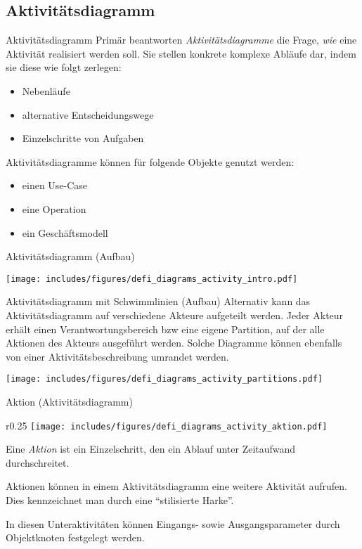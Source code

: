 \subsection{Aktivitätsdiagramm}

\begin{defi}{Aktivitätsdiagramm}
    Primär beantworten \emph{Aktivitätsdiagramme} die Frage, \emph{wie} eine Aktivität realisiert werden soll.
    Sie stellen konkrete komplexe Abläufe dar, indem sie diese wie folgt zerlegen:
    \begin{itemize}
        \item Nebenläufe
        \item alternative Entscheidungswege
        \item Einzelschritte von Aufgaben
    \end{itemize}

    Aktivitätsdiagramme können für folgende Objekte genutzt werden:
    \begin{itemize}
        \item einen Use-Case
        \item eine Operation
        \item ein Geschäftsmodell
    \end{itemize}
\end{defi}

\begin{diag}{Aktivitätsdiagramm (Aufbau)}
    \begin{center}
        \texttt{[image: includes/figures/defi\_diagrams\_activity\_intro.pdf]}
    \end{center}
\end{diag}

\begin{diag}{Aktivitätsdiagramm mit Schwimmlinien (Aufbau)}
    Alternativ kann das Aktivitätsdiagramm auf verschiedene Akteure aufgeteilt werden.
    Jeder Akteur erhält einen Verantwortungsbereich bzw eine eigene Partition, auf der alle Aktionen des Akteurs ausgeführt werden.
    Solche Diagramme können ebenfalls von einer Aktivitätsbeschreibung umrandet werden.
    \begin{center}
        \texttt{[image: includes/figures/defi\_diagrams\_activity\_partitions.pdf]}
    \end{center}
\end{diag}

\begin{diag}{Aktion (Aktivitätsdiagramm)}
    \begin{wrapfigure}{r}{0.25\textwidth}
        \centering
        \texttt{[image: includes/figures/defi\_diagrams\_activity\_aktion.pdf]}
    \end{wrapfigure}
    Eine \emph{Aktion} ist ein Einzelschritt, den ein Ablauf unter Zeitaufwand durchschreitet.

    Aktionen können in einem Aktivitätsdiagramm eine weitere Aktivität aufrufen.
    Dies kennzeichnet man durch eine \enquote{stilisierte Harke}.

    In diesen Unteraktivitäten können Eingangs- sowie Ausgangsparameter durch Objektknoten festgelegt werden.
\end{diag}

